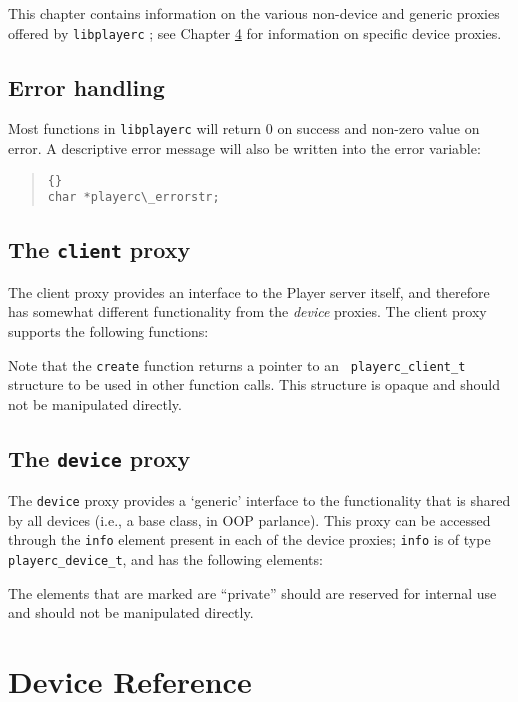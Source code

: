 \documentclass[11pt]{report}
\def\libplayerc {{\tt libplayerc} }
\begin{document}
This chapter contains information on the various non-device and
generic proxies offered by \libplayerc; see Chapter \ref{chap.devices}
for information on specific device proxies.


\section{Error handling}

Most functions in \libplayerc will return 0 on success and non-zero
value on error.  A descriptive error message will also be written into
the error variable:
\begin{quote}
\begin{lstlisting}{}
char *playerc\_errorstr;
\end{lstlisting}
\end{quote}


\section{The {\tt client} proxy}

The client proxy provides an interface to the Player server itself,
and therefore has somewhat different functionality from the {\em
device} proxies.  The client proxy supports the following functions:
\begin{quote}

\end{quote}
Note that the {\tt create} function returns a pointer to an {\tt
playerc\_client\_t} structure to be used in other function calls.
This structure is opaque and should not be manipulated directly.


\section{The {\tt device} proxy}

The {\tt device} proxy provides a `generic' interface to the
functionality that is shared by all devices (i.e., a base class, in
OOP parlance).  This proxy can be accessed through the {\tt info}
element present in each of the device proxies; {\tt info} is of type
{\tt playerc\_device\_t}, and has the following elements:
\begin{quote}

\end{quote}
The elements that are marked are ``private'' should are reserved for 
internal use and should not be manipulated directly.


\chapter{Device Reference}
\label{chap.devices}
\end{document}
